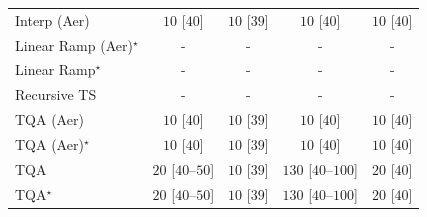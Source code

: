 \begin{tabular}{l|cccc|}
Interp (Aer) & {\cellcolor[HTML]{F7FCF5}} \color[HTML]{000000} $10$ [$40$] & {\cellcolor[HTML]{F7FCF5}} \color[HTML]{000000} $10$ [$39$] & {\cellcolor[HTML]{F7FCF5}} \color[HTML]{000000} $10$ [$40$] & {\cellcolor[HTML]{F7FCF5}} \color[HTML]{000000} $10$ [$40$] \\
Linear Ramp (Aer)$^\star$ & {\cellcolor[HTML]{000000}} \color[HTML]{F1F1F1} {\cellcolor{white}} \color{black} - & {\cellcolor[HTML]{000000}} \color[HTML]{F1F1F1} {\cellcolor{white}} \color{black} - & {\cellcolor[HTML]{000000}} \color[HTML]{F1F1F1} {\cellcolor{white}} \color{black} - & {\cellcolor[HTML]{000000}} \color[HTML]{F1F1F1} {\cellcolor{white}} \color{black} - \\
Linear Ramp$^\star$ & {\cellcolor[HTML]{000000}} \color[HTML]{F1F1F1} {\cellcolor{white}} \color{black} - & {\cellcolor[HTML]{000000}} \color[HTML]{F1F1F1} {\cellcolor{white}} \color{black} - & {\cellcolor[HTML]{000000}} \color[HTML]{F1F1F1} {\cellcolor{white}} \color{black} - & {\cellcolor[HTML]{000000}} \color[HTML]{F1F1F1} {\cellcolor{white}} \color{black} - \\
Recursive TS & {\cellcolor[HTML]{000000}} \color[HTML]{F1F1F1} {\cellcolor{white}} \color{black} - & {\cellcolor[HTML]{000000}} \color[HTML]{F1F1F1} {\cellcolor{white}} \color{black} - & {\cellcolor[HTML]{000000}} \color[HTML]{F1F1F1} {\cellcolor{white}} \color{black} - & {\cellcolor[HTML]{000000}} \color[HTML]{F1F1F1} {\cellcolor{white}} \color{black} - \\
TQA (Aer) & {\cellcolor[HTML]{F7FCF5}} \color[HTML]{000000} $10$ [$40$] & {\cellcolor[HTML]{F7FCF5}} \color[HTML]{000000} $10$ [$39$] & {\cellcolor[HTML]{F7FCF5}} \color[HTML]{000000} $10$ [$40$] & {\cellcolor[HTML]{F7FCF5}} \color[HTML]{000000} $10$ [$40$] \\
TQA (Aer)$^\star$ & {\cellcolor[HTML]{F7FCF5}} \color[HTML]{000000} $10$ [$40$] & {\cellcolor[HTML]{F7FCF5}} \color[HTML]{000000} $10$ [$39$] & {\cellcolor[HTML]{F7FCF5}} \color[HTML]{000000} $10$ [$40$] & {\cellcolor[HTML]{F7FCF5}} \color[HTML]{000000} $10$ [$40$] \\
TQA & {\cellcolor[HTML]{F5FBF3}} \color[HTML]{000000} $20$ [$40$--$50$] & {\cellcolor[HTML]{F7FCF5}} \color[HTML]{000000} $10$ [$39$] & {\cellcolor[HTML]{DFF3DA}} \color[HTML]{000000} $130$ [$40$--$100$] & {\cellcolor[HTML]{F5FBF3}} \color[HTML]{000000} $20$ [$40$] \\
TQA$^\star$ & {\cellcolor[HTML]{F5FBF3}} \color[HTML]{000000} $20$ [$40$--$50$] & {\cellcolor[HTML]{F7FCF5}} \color[HTML]{000000} $10$ [$39$] & {\cellcolor[HTML]{DFF3DA}} \color[HTML]{000000} $130$ [$40$--$100$] & {\cellcolor[HTML]{F5FBF3}} \color[HTML]{000000} $20$ [$40$] \\

\end{tabular}
